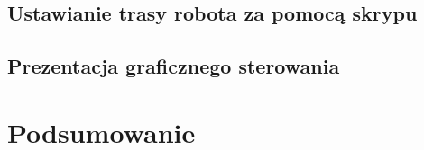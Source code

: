 \documentclass[eng,printmode]{mgr}
\begin{document}
 \section{Ustawianie trasy robota za pomocą skrypu}
 \section{Prezentacja graficznego sterowania}

\chapter{Podsumowanie}

\end{document}
